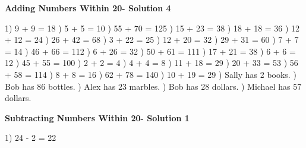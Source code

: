 \documentclass{article}%
\begin{document}
\newpage%
\large%
\begin{center}%
\textbf{Adding Numbers Within 20- Solution 4}%
\newline%
\end{center} \normalsize%
1) 9 + 9 = 18%
) 5 + 5 = 10%
) 55 + 70 = 125%
) 15 + 23 = 38%
) 18 + 18 = 36%
) 12 + 12 = 24%
) 26 + 42 = 68%
) 3 + 22 = 25%
) 12 + 20 = 32%
) 29 + 31 = 60%
) 7 + 7 = 14%
) 46 + 66 = 112%
) 6 + 26 = 32%
) 50 + 61 = 111%
) 17 + 21 = 38%
) 6 + 6 = 12%
) 45 + 55 = 100%
) 2 + 2 = 4%
) 4 + 4 = 8%
) 11 + 18 = 29%
) 20 + 33 = 53%
) 56 + 58 = 114%
) 8 + 8 = 16%
) 62 + 78 = 140%
) 10 + 19 = 29%
) Sally has 2 books.%
) Bob has 86 bottles.%
) Alex has 23 marbles.%
) Bob has 28 dollars.%
) Michael has 57 dollars.%
\newline%
\newpage%
\large%
\begin{center}%
\textbf{Subtracting Numbers Within 20- Solution 1}%
\newline%
\end{center} \normalsize%
1) 24 {-} 2 = 22%
\newline%
\end{document}
